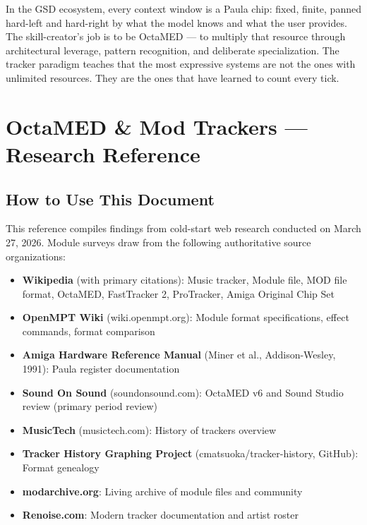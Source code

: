 \documentclass[11pt,letterpaper]{article}
\newcommand{\stageheader}[2]{%
  \noindent\colorbox{#2}{\makebox[\textwidth][l]{%
    \textcolor{white}{\bfseries\sffamily\hspace{6pt}#1\hspace{6pt}}}}%
  \vspace{0.5em}\par%
}
\begin{document}
In the GSD ecosystem, every context window is a Paula chip: fixed, finite, panned hard-left and hard-right by what the model knows and what the user provides. The skill-creator's job is to be OctaMED --- to multiply that resource through architectural leverage, pattern recognition, and deliberate specialization. The tracker paradigm teaches that the most expressive systems are not the ones with unlimited resources. They are the ones that have learned to count every tick.

\newpage
\stageheader{STAGE 2 --- RESEARCH REFERENCE}{secondary}

\section{OctaMED \& Mod Trackers --- Research Reference}

\subsection{How to Use This Document}

This reference compiles findings from cold-start web research conducted on March 27, 2026. Module surveys draw from the following authoritative source organizations:

\begin{itemize}[leftmargin=1.5em]
  \item \textbf{Wikipedia} (with primary citations): Music tracker, Module file, MOD file format, OctaMED, FastTracker 2, ProTracker, Amiga Original Chip Set
  \item \textbf{OpenMPT Wiki} (wiki.openmpt.org): Module format specifications, effect commands, format comparison
  \item \textbf{Amiga Hardware Reference Manual} (Miner et al., Addison-Wesley, 1991): Paula register documentation
  \item \textbf{Sound On Sound} (soundonsound.com): OctaMED v6 and Sound Studio review (primary period review)
  \item \textbf{MusicTech} (musictech.com): History of trackers overview
  \item \textbf{Tracker History Graphing Project} (cmatsuoka/tracker-history, GitHub): Format genealogy
  \item \textbf{modarchive.org}: Living archive of module files and community
  \item \textbf{Renoise.com}: Modern tracker documentation and artist roster
\end{itemize}
\end{document}
